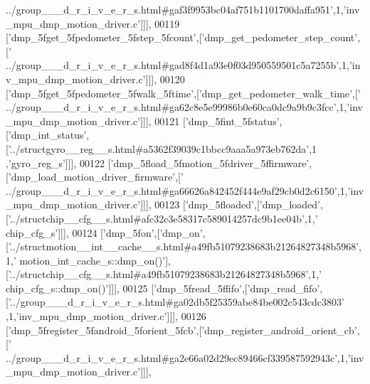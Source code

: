 \begin{DoxyCode}
{      ../group\_\_\_d\_r\_i\_v\_e\_r\_s.html#gaf3f9953bc04af751b1101700daffa951'},1,\textcolor{stringliteral}{'inv\_mpu\_dmp\_motion\_driver.c'}]]],
00119   [\textcolor{stringliteral}{'dmp\_5fget\_5fpedometer\_5fstep\_5fcount'},[\textcolor{stringliteral}{'dmp\_get\_pedometer\_step\_count'},[\textcolor{stringliteral}{'
      ../group\_\_\_d\_r\_i\_v\_e\_r\_s.html#gad8f4d1a93e0f03d950559501c5a7255b'},1,\textcolor{stringliteral}{'inv\_mpu\_dmp\_motion\_driver.c'}]]],
00120   [\textcolor{stringliteral}{'dmp\_5fget\_5fpedometer\_5fwalk\_5ftime'},[\textcolor{stringliteral}{'dmp\_get\_pedometer\_walk\_time'},[\textcolor{stringliteral}{'
      ../group\_\_\_d\_r\_i\_v\_e\_r\_s.html#ga62c8e5e99986b0e60ca0dc9a9b9c3fcc'},1,\textcolor{stringliteral}{'inv\_mpu\_dmp\_motion\_driver.c'}]]],
00121   [\textcolor{stringliteral}{'dmp\_5fint\_5fstatus'},[\textcolor{stringliteral}{'dmp\_int\_status'},[\textcolor{stringliteral}{'../structgyro\_\_reg\_\_s.html#a5362f39039c1bbcc9aaa5a973eb762da'},1
      ,\textcolor{stringliteral}{'gyro\_reg\_s'}]]],
00122   [\textcolor{stringliteral}{'dmp\_5fload\_5fmotion\_5fdriver\_5ffirmware'},[\textcolor{stringliteral}{'dmp\_load\_motion\_driver\_firmware'},[\textcolor{stringliteral}{'
      ../group\_\_\_d\_r\_i\_v\_e\_r\_s.html#ga66626a842452f444e9af29cb0d2c6150'},1,\textcolor{stringliteral}{'inv\_mpu\_dmp\_motion\_driver.c'}]]],
00123   [\textcolor{stringliteral}{'dmp\_5floaded'},[\textcolor{stringliteral}{'dmp\_loaded'},[\textcolor{stringliteral}{'../structchip\_\_cfg\_\_s.html#afc32c3e58317c589014257dc9b1ee04b'},1,\textcolor{stringliteral}{'
      chip\_cfg\_s'}]]],
00124   [\textcolor{stringliteral}{'dmp\_5fon'},[\textcolor{stringliteral}{'dmp\_on'},[\textcolor{stringliteral}{'../structmotion\_\_int\_\_cache\_\_s.html#a49fb51079238683b21264827348b5968'},1,\textcolor{stringliteral}{'
      motion\_int\_cache\_s::dmp\_on()'}],[\textcolor{stringliteral}{'../structchip\_\_cfg\_\_s.html#a49fb51079238683b21264827348b5968'},1,\textcolor{stringliteral}{'
      chip\_cfg\_s::dmp\_on()'}]]],
00125   [\textcolor{stringliteral}{'dmp\_5fread\_5ffifo'},[\textcolor{stringliteral}{'dmp\_read\_fifo'},[\textcolor{stringliteral}{'../group\_\_\_d\_r\_i\_v\_e\_r\_s.html#ga02db5f25359abe84be002c543cdc3803'}
      ,1,\textcolor{stringliteral}{'inv\_mpu\_dmp\_motion\_driver.c'}]]],
00126   [\textcolor{stringliteral}{'dmp\_5fregister\_5fandroid\_5forient\_5fcb'},[\textcolor{stringliteral}{'dmp\_register\_android\_orient\_cb'},[\textcolor{stringliteral}{'
      ../group\_\_\_d\_r\_i\_v\_e\_r\_s.html#ga2e66a02d29ec89466cf339587592943c'},1,\textcolor{stringliteral}{'inv\_mpu\_dmp\_motion\_driver.c'}]]],

\end{DoxyCode}
